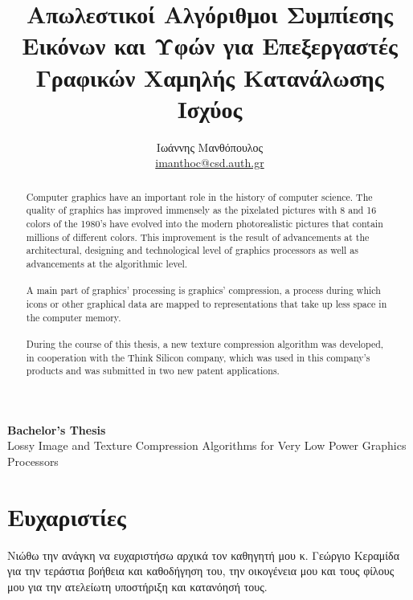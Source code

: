 \documentclass[a4paper,12pt]{report}
\def\te{\textlatin}
\def\tg{\textgreek}
\begin{document}
    \begin{center}
        \textbf{Bachelor's Thesis} \\
        Lossy Image and Texture Compression Algorithms for Very Low Power Graphics Processors
    \end{center}
\begin{abstract}

    Computer graphics have an important role in the history of computer science. The quality of graphics has improved immensely as the pixelated pictures with 8 and 16 colors of the 1980's have evolved into the modern photorealistic pictures that contain millions of different colors. This improvement is the result of advancements at the architectural, designing and technological level of graphics processors as well as advancements at the algorithmic level. \\~\\
    A main part of graphics' processing is graphics' compression, a process during which icons or other graphical data are mapped to representations that take up less space in the computer memory. \\~\\
    During the course of this thesis, a new texture compression algorithm was developed, in cooperation with the Think Silicon company, which was used in this company's products and was submitted in two new patent applications.
\end{abstract}

\section*{Ευχαριστίες}
Νιώθω την ανάγκη να ευχαριστήσω αρχικά τον καθηγητή μου κ. Γεώργιο Κεραμίδα για την τεράστια βοήθεια και καθοδήγηση του, την οικογένεια μου και τους φίλους μου για την ατελείωτη υποστήριξη και κατανόησή τους.
\thispagestyle{empty}

\title{Απωλεστικοί Αλγόριθμοι Συμπίεσης Εικόνων και Υφών για Επεξεργαστές Γραφικών Χαμηλής Κατανάλωσης Ισχύος}
\author{Ιωάννης Μανθόπουλος \\
\href{mailto:imanthoc@csd.auth.gr}{\te{imanthoc@csd.auth.gr}}}
\maketitle

\tableofcontents
\thispagestyle{empty}

\renewcommand{\listfigurename}{\tg{Λίστα Σχημάτων}}
\renewcommand{\listtablename}{\tg{Λίστα Πινάκων}}
\renewcommand{\listalgorithmname}
{\tg{Λίστα Αλγορίθμων}}

\listoftables
\listoffigures
\listofalgorithms

\printbibliography[title=\tg{Βιβλιογραφία}]
\end{document}
